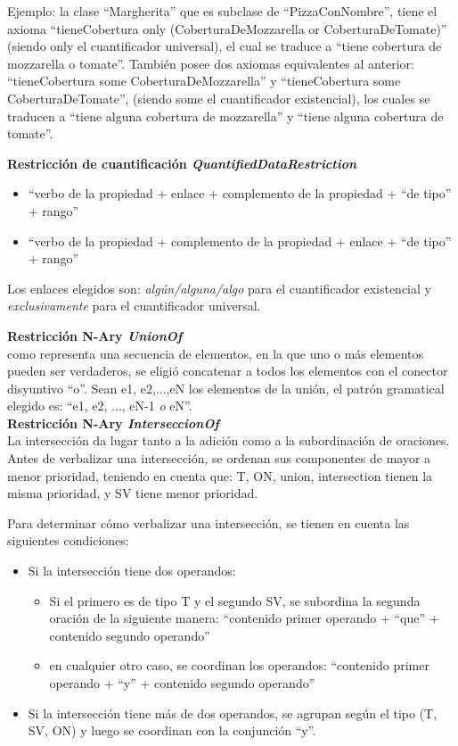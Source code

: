 Ejemplo: la clase ``Margherita'' que es subclase de ``PizzaConNombre'', tiene el axioma ``tieneCobertura only 
    (CoberturaDeMozzarella or CoberturaDeTomate)'' (siendo only el cuantificador universal), el cual se traduce a ``tiene cobertura de mozzarella o tomate''. También posee dos axiomas equivalentes al anterior: ``tieneCobertura some CoberturaDeMozzarella'' y ``tieneCobertura some CoberturaDeTomate'', (siendo some el cuantificador existencial), los cuales se traducen a ``tiene alguna cobertura de mozzarella'' y ``tiene alguna cobertura de tomate''.
    
{\bf Restricción de cuantificación \emph{QuantifiedDataRestriction}}
\begin{itemize}
    \item ``verbo de la propiedad + enlace + complemento de la propiedad + ``de tipo'' + rango''
    \item ``verbo de la propiedad + complemento de la propiedad + enlace + ``de tipo'' + rango''
\end{itemize}
Los enlaces elegidos son: \emph{algún/alguna/algo} para el cuantificador existencial y \emph{exclusivamente} para el cuantificador universal.

{\bf Restricción N-Ary \emph{UnionOf}} \\
como representa una secuencia de elementos, en la que uno o más elementos pueden ser verdaderos, se eligió concatenar a todos los elementos con el conector disyuntivo ``o''. Sean e1, e2,...,eN los elementos de la unión, el patrón gramatical elegido es: ``e1, e2, ..., eN-1 \emph{o} eN''.
\\

{\bf Restricción N-Ary \emph{InterseccionOf}} \\
La intersección da lugar tanto a la adición como a la subordinación de oraciones. Antes de verbalizar una intersección, se ordenan sus componentes de mayor a menor prioridad, teniendo en cuenta que: T, ON, union, intersection tienen la misma prioridad, y SV tiene menor prioridad. 

Para determinar cómo verbalizar una intersección, se tienen en cuenta las siguientes condiciones:
\begin{itemize}
    \item Si la intersección tiene dos operandos:
        \begin{itemize}
            \item Si el primero es de tipo T  y el segundo SV, se subordina la segunda oración de la siguiente manera:
            ``contenido primer operando + ``que'' + contenido segundo operando''
            \item en cualquier otro caso, se coordinan los operandos:
            ``contenido primer operando + ``y'' + contenido segundo operando''
        \end{itemize}
        \item Si la intersección tiene más de dos operandos, se agrupan según el tipo  (T, SV, ON) y luego se coordinan con la conjunción ``y''.
        
\end{itemize}

